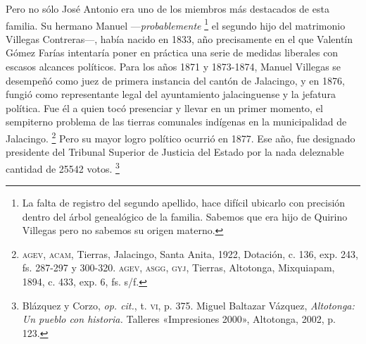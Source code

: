 \documentclass[14pt,twoside,final]{extbook} %
\let\oldfootnote\footnote
\renewcommand\footnote[1]{%
\oldfootnote{\hspace{1mm}#1}}
\begin{document}
Pero no sólo José Antonio era uno de los miembros más destacados de esta familia. Su hermano Manuel ---\emph{probablemente}\footnote{La falta de registro del segundo apellido, hace difícil ubicarlo con precisión dentro del árbol genealógico de la familia. Sabemos que era hijo de Quirino Villegas\index[nombres]{Villegas, Quirino} pero no sabemos su origen materno.} el segundo hijo del matrimonio Villegas Contreras---, había nacido en 1833, año precisamente en el que Valentín Gómez Farías intentaría poner en práctica una serie de medidas liberales con escasos alcances políticos. Para los años 1871 y 1873-1874, Manuel Villegas se desempeñó como juez de primera instancia del cantón de Jalacingo, y en 1876, fungió como representante legal del ayuntamiento jalacinguense y la jefatura política. Fue él a quien tocó presenciar y llevar en un primer momento, el sempiterno problema de las tierras comunales indígenas en la municipalidad de Jalacingo.\footnote{\textsc{agev, acam}, Tierras, Jalacingo, Santa Anita, 1922, Dotación, c. 136, exp. 243, fs. 287-297 y 300-320. \textsc{agev, asgg, gyj}, Tierras, Altotonga, Mixquiapam, 1894, c. 433, exp. 6, fs. s/f.} Pero su mayor logro político ocurrió en 1877. Ese año, fue designado presidente del Tribunal Superior de Justicia del Estado por la nada deleznable cantidad de 25542 votos.\footnote{Blázquez y Corzo, \emph{op. cit.}, t. \textsc{vi}, p. 375. Miguel Baltazar Vázquez, \emph{Altotonga: Un pueblo con historia.} Talleres «Impresiones 2000», Altotonga, 2002, p. 123.}
\end{document}
